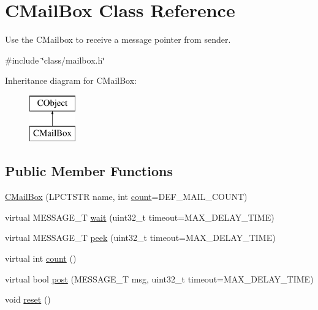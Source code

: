 \hypertarget{class_c_mail_box}{\section{C\-Mail\-Box Class Reference}
\label{class_c_mail_box}
}


Use the C\-Mailbox to receive a message pointer from sender.  




{\ttfamily \#include \char`\"{}class/mailbox.\-h\char`\"{}}

Inheritance diagram for C\-Mail\-Box\-:\begin{figure}[H]
\begin{center}
\leavevmode
\includegraphics[height=2.000000cm]{class_c_mail_box}
\end{center}
\end{figure}
\subsection*{Public Member Functions}
\begin{DoxyCompactItemize}
\item 
\hyperlink{class_c_mail_box_a860c64ec622b6bb2641f8e69748ba9e6}{C\-Mail\-Box} (L\-P\-C\-T\-S\-T\-R name, int \hyperlink{class_c_mail_box_a11592da3e55cf9bedc8d2cf36d56e9bd}{count}=D\-E\-F\-\_\-\-M\-A\-I\-L\-\_\-\-C\-O\-U\-N\-T)
\item 
virtual M\-E\-S\-S\-A\-G\-E\-\_\-\-T \hyperlink{class_c_mail_box_ad03ed94ae07a9309d9f42695c9df7e94}{wait} (uint32\-\_\-t timeout=M\-A\-X\-\_\-\-D\-E\-L\-A\-Y\-\_\-\-T\-I\-M\-E)
\item 
virtual M\-E\-S\-S\-A\-G\-E\-\_\-\-T \hyperlink{class_c_mail_box_adc923a33209756bb2ed9e1838b12b68c}{peek} (uint32\-\_\-t timeout=M\-A\-X\-\_\-\-D\-E\-L\-A\-Y\-\_\-\-T\-I\-M\-E)
\item 
virtual int \hyperlink{class_c_mail_box_a11592da3e55cf9bedc8d2cf36d56e9bd}{count} ()
\item 
virtual bool \hyperlink{class_c_mail_box_a5ab581cd317944e824efbbc6f7f4d14d}{post} (M\-E\-S\-S\-A\-G\-E\-\_\-\-T msg, uint32\-\_\-t timeout=M\-A\-X\-\_\-\-D\-E\-L\-A\-Y\-\_\-\-T\-I\-M\-E)
\item 
void \hyperlink{class_c_mail_box_a73d5b694b1e7ce4e05c7ccc8f1dfd695}{reset} ()
\end{DoxyCompactItemize}

